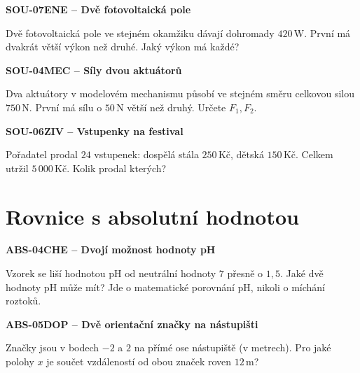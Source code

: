 \documentclass[11pt,a4paper]{article}
\begin{document}
\vspace{4mm}\par\noindent\dotfill\par\medskip
\par\medskip\noindent\textbf{SOU-07}\quad\textbf{ENE -- Dvě fotovoltaická pole}\par
Dvě fotovoltaická pole ve stejném okamžiku dávají dohromady $420\,\mathrm W$. První má dvakrát větší výkon než druhé. Jaký výkon má každé?

\vspace{4mm}\par\noindent\dotfill\par\medskip
\par\medskip\noindent\textbf{SOU-04}\quad\textbf{MEC -- Síly dvou aktuátorů}\par
Dva aktuátory v modelovém mechanismu působí ve stejném směru celkovou silou $750\,\mathrm N$. První má sílu o $50\,\mathrm N$ větší než druhý. Určete $F_1,F_2$.

\vspace{4mm}\par\noindent\dotfill\par\medskip
\par\medskip\noindent\textbf{SOU-06}\quad\textbf{ZIV -- Vstupenky na festival}\par
Pořadatel prodal $24$ vstupenek: dospělá stála $250\,\text{Kč}$, dětská $150\,\text{Kč}$. Celkem utržil $5\,000\,\text{Kč}$. Kolik prodal kterých?

\vspace{4mm}\par\noindent\dotfill\par\medskip

\section{Rovnice s absolutní hodnotou}
\par\medskip\noindent\textbf{ABS-04}\quad\textbf{CHE -- Dvojí možnost hodnoty pH}\par
Vzorek se liší hodnotou pH od neutrální hodnoty $7$ přesně o $1{,}5$. Jaké dvě hodnoty pH může mít? Jde o matematické porovnání pH, nikoli o míchání roztoků.

\vspace{4mm}\par\noindent\dotfill\par\medskip
\par\medskip\noindent\textbf{ABS-05}\quad\textbf{DOP -- Dvě orientační značky na nástupišti}\par
Značky jsou v bodech $-2$ a $2$ na přímé ose nástupiště (v metrech). Pro jaké polohy $x$ je součet vzdáleností od obou značek roven $12\,\mathrm m$?
\end{document}
